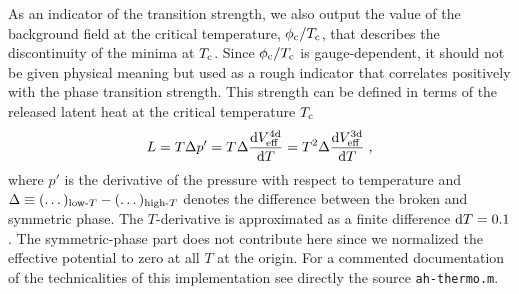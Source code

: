 \documentclass[11pt]{article}
\newcommand{\Tc}{T_{\rm c}}
\renewcommand{\rmi}[1]{{\mbox{\scriptsize #1}}}
\begin{document}
As an indicator of the transition strength, we also output
the value of the background field at the critical temperature,
$\phi_\rmi{c}/\Tc$, that describes the discontinuity of the minima at $\Tc$.
Since $\phi_\rmi{c}/\Tc$ is gauge-dependent, it should
not be given physical meaning but 
used as a rough indicator that correlates positively with
the phase transition strength.
This strength can be defined in terms of
the released latent heat at the critical temperature $\Tc$ 
\begin{equation}
L = T \Delta p' =
  T^{ }\Delta \frac{{\rm d}V^{\rmi{4d}}_{\rmi{eff}}}{{\rm d}T} =
  T^{2}\Delta \frac{{\rm d}V^{\rmi{3d}}_{\rmi{eff}}}{{\rm d}T}
  \;,
\end{equation}
where
$p'$ is the derivative of the pressure with respect to temperature and
$\Delta \equiv
(\dots)_{\rmi{low-}T} -
(\dots)_{\rmi{high-}T}$ denotes the difference between the broken and symmetric phase.
The $T$-derivative is approximated as a finite difference ${\rm d}T = 0.1$.
The symmetric-phase part does not contribute here since we normalized
the effective potential to zero at all $T$ at the origin.
For a commented documentation of the technicalities of this implementation
see directly the source {\tt ah-thermo.m}.       
\end{document}
